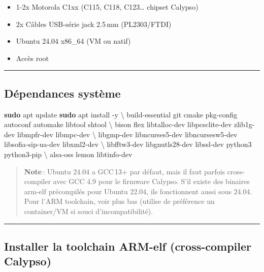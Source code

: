 \documentclass[
]{article}
\newenvironment{Shaded}{\begin{snugshade}}{\end{snugshade}}
\newcommand{\AttributeTok}[1]{\textcolor[rgb]{0.13,0.29,0.53}{#1}}
\newcommand{\DataTypeTok}[1]{\textcolor[rgb]{0.13,0.29,0.53}{#1}}
\newcommand{\FunctionTok}[1]{\textcolor[rgb]{0.13,0.29,0.53}{\textbf{#1}}}
\newcommand{\NormalTok}[1]{#1}
\providecommand{\tightlist}{%
  \setlength{\itemsep}{0pt}\setlength{\parskip}{0pt}}
\begin{document}
\begin{itemize}
\tightlist
\item
  1-2x Motorola C1xx (C115, C118, C123\ldots{} chipset Calypso)
\item
  2x Câbles USB-série jack 2.5\,mm (PL2303/FTDI)
\item
  Ubuntu 24.04 x86\_64 (VM ou natif)
\item
  Accès root
\end{itemize}

\begin{center}\rule{0.5\linewidth}{0.5pt}\end{center}

\subsection{Dépendances système}\label{duxe9pendances-systuxe8me-1}

\begin{Shaded}
\begin{Highlighting}[]
\FunctionTok{sudo}\NormalTok{ apt update}
\FunctionTok{sudo}\NormalTok{ apt install }\AttributeTok{{-}y} \DataTypeTok{\textbackslash{}}
\NormalTok{  build{-}essential git cmake pkg{-}config autoconf automake libtool shtool }\DataTypeTok{\textbackslash{}}
\NormalTok{  bison flex libtalloc{-}dev libpcsclite{-}dev zlib1g{-}dev libmpfr{-}dev libmpc{-}dev }\DataTypeTok{\textbackslash{}}
\NormalTok{  libgmp{-}dev libncurses5{-}dev libncursesw5{-}dev libsofia{-}sip{-}ua{-}dev libxml2{-}dev }\DataTypeTok{\textbackslash{}}
\NormalTok{  libfftw3{-}dev libgnutls28{-}dev libssl{-}dev python3 python3{-}pip }\DataTypeTok{\textbackslash{}}
\NormalTok{  alsa{-}oss lemon libtinfo{-}dev}
\end{Highlighting}
\end{Shaded}

\begin{quote}
\textbf{Note}\,: Ubuntu 24.04 a GCC\,13+ par défaut, mais il faut
parfois cross-compiler avec GCC 4.9 pour le firmware Calypso. S'il
existe des binaires arm-elf précompilés pour Ubuntu 22.04, ils
fonctionnent aussi sous 24.04. Pour l'ARM toolchain, voir plus bas
(utilise de préférence un container/VM si souci d'incompatibilité).
\end{quote}

\begin{center}\rule{0.5\linewidth}{0.5pt}\end{center}

\subsection{Installer la toolchain ARM-elf (cross-compiler
Calypso)}\label{installer-la-toolchain-arm-elf-cross-compiler-calypso}
\end{document}
